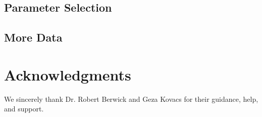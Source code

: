\documentclass[preprint]{style}
\begin{document}
\subsection{Parameter Selection}

\subsection{More Data}


\section{Acknowledgments}

We sincerely thank Dr. Robert Berwick  and Geza Kovacs
for their guidance, help, and support.



%


\balancecolumns
\end{document}
